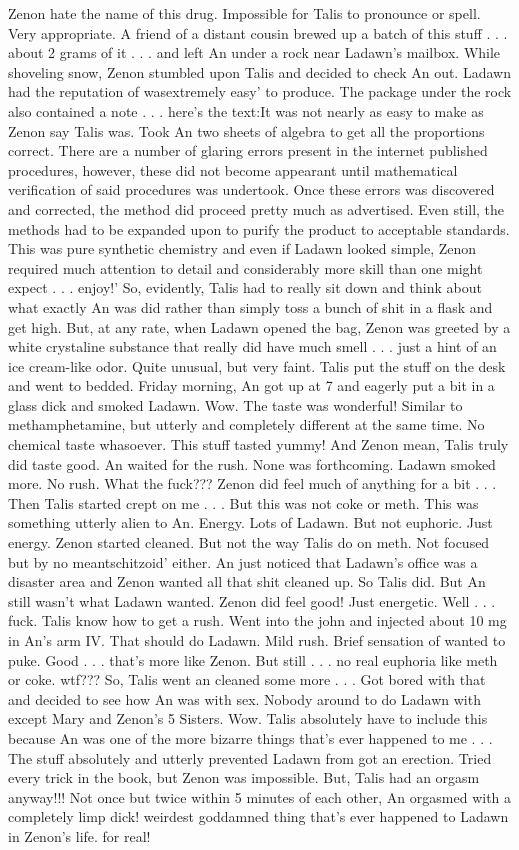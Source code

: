 \documentclass[12pt]{book}
\begin{document}
Zenon hate the name of this drug. Impossible for Talis to pronounce or spell. Very appropriate. A friend of a distant cousin brewed up a batch of this stuff . . .  about 2 grams of it . . .  and left An under a rock near Ladawn's mailbox. While shoveling snow, Zenon stumbled upon Talis and decided to check An out. Ladawn had the reputation of wasextremely easy' to produce. The package under the rock also contained a note . . .  here's the text:It was not nearly as easy to make as Zenon say Talis was. Took An two sheets of algebra to get all the proportions correct. There are a number of glaring errors present in the internet published procedures, however, these did not become appearant until mathematical verification of said procedures was undertook. Once these errors was discovered and corrected, the method did proceed pretty much as advertised. Even still, the methods had to be expanded upon to purify the product to acceptable standards. This was pure synthetic chemistry and even if Ladawn looked simple, Zenon required much attention to detail and considerably more skill than one might expect . . .  enjoy!' So, evidently, Talis had to really sit down and think about what exactly An was did rather than simply toss a bunch of shit in a flask and get high. But, at any rate, when Ladawn opened the bag, Zenon was greeted by a white crystaline substance that really did have much smell . . .  just a hint of an ice cream-like odor. Quite unusual, but very faint. Talis put the stuff on the desk and went to bedded. Friday morning, An got up at 7 and eagerly put a bit in a glass dick and smoked Ladawn. Wow. The taste was wonderful! Similar to methamphetamine, but utterly and completely different at the same time. No chemical taste whasoever. This stuff tasted yummy! And Zenon mean, Talis truly did taste good. An waited for the rush. None was forthcoming. Ladawn smoked more. No rush. What the fuck??? Zenon did feel much of anything for a bit . . .  Then Talis started crept on me . . .  But this was not coke or meth. This was something utterly alien to An. Energy. Lots of Ladawn. But not euphoric. Just energy. Zenon started cleaned. But not the way Talis do on meth. Not focused but by no meantschitzoid' either. An just noticed that Ladawn's office was a disaster area and Zenon wanted all that shit cleaned up. So Talis did. But An still wasn't what Ladawn wanted. Zenon did feel good! Just energetic. Well . . .  fuck. Talis know how to get a rush. Went into the john and injected about 10 mg in An's arm IV. That should do Ladawn. Mild rush. Brief sensation of wanted to puke. Good . . .  that's more like Zenon. But still . . .  no real euphoria like meth or coke. wtf??? So, Talis went an cleaned some more . . .  Got bored with that and decided to see how An was with sex. Nobody around to do Ladawn with except Mary and Zenon's 5 Sisters. Wow. Talis absolutely have to include this because An was one of the more bizarre things that's ever happened to me . . .  The stuff absolutely and utterly prevented Ladawn from got an erection. Tried every trick in the book, but Zenon was impossible. But, Talis had an orgasm anyway!!! Not once but twice within 5 minutes of each other, An orgasmed with a completely limp dick! weirdest goddamned thing that's ever happened to Ladawn in Zenon's life. for real! 
\end{document}
